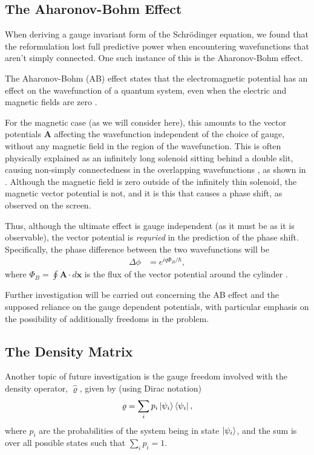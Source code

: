 \subsection{The Aharonov-Bohm Effect}

When deriving a gauge invariant form of the Schr\"odinger equation, we found
that the reformulation lost full predictive power when encountering
wavefunctions that aren't simply connected. One such instance of this is the
Aharonov-Bohm effect.

The Aharonov-Bohm (AB) effect states that the electromagnetic potential has an effect
on the wavefunction of a quantum system, even when the electric and magnetic
fields are zero \cite{aharonov-bohm}.

For the magnetic case (as we will consider here), this amounts to the vector
potentials $\mathbf{A}$ affecting the wavefunction independent of the choice of
gauge, without any magnetic field in the region of the wavefunction. This is
often physically explained as an infinitely long solenoid sitting behind a
double slit, causing non-simply connectedness in the overlapping wavefunctions
\cite{aharonov-rohrlich}, as shown in .  Although the
magnetic field is zero outside of the infinitely thin solenoid, the magnetic
vector potential is not, and it is this that causes a phase shift, as observed
on the screen.

Thus, although the ultimate effect is gauge independent (as it must be as it is
observable), the vector potential is \textit{requried} in the prediction of the
phase shift. Specifically, the phase difference between the two wavefunctions
will be
\begin{align}
    \Delta \phi &= e^{i q \Phi_B / \hbar},
\end{align}
where $\Phi_B = \oint \mathbf{A} \cdot d\mathbf{x}$ is the flux of the vector
potential around the cylinder \cite{aharonov-rohrlich}.

Further investigation will be carried out concerning the AB effect and the
supposed reliance on the gauge dependent potentials, with particular emphasis on
the possibility of additionally freedoms in the problem.

\subsection{The Density Matrix}

Another topic of future investigation is the gauge freedom involved with the
density operator, $\hat \varrho$, given by (using Dirac notation)
\begin{align}
    \varrho = \sum_i p_i \Ket{\psi_i}\bra{\psi_i},
\end{align}
where $p_i$ are the probabilities of the system being in state $\Ket{\psi_i}$,
and the sum is over all possible states such that $\sum_i p_i = 1$.

